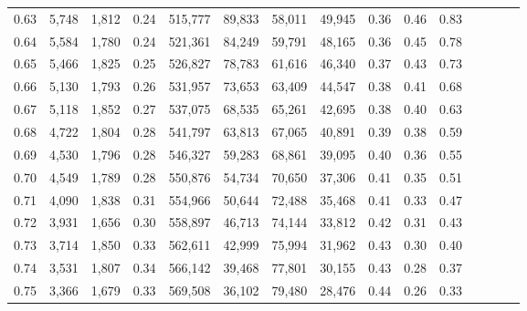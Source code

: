 \begin{tabular}{rrrcrrrrrrrrrrr}
0.63 &   5,748 &  1,812 &                                       0.24 &  515,777 &   89,833 &   58,011 &   49,945 &  0.36 &  0.46 &                         0.83 \\
0.64 &   5,584 &  1,780 &                                       0.24 &  521,361 &   84,249 &   59,791 &   48,165 &  0.36 &  0.45 &                         0.78 \\
0.65 &   5,466 &  1,825 &                                       0.25 &  526,827 &   78,783 &   61,616 &   46,340 &  0.37 &  0.43 &                         0.73 \\
0.66 &   5,130 &  1,793 &                                       0.26 &  531,957 &   73,653 &   63,409 &   44,547 &  0.38 &  0.41 &                         0.68 \\
0.67 &   5,118 &  1,852 &                                       0.27 &  537,075 &   68,535 &   65,261 &   42,695 &  0.38 &  0.40 &                         0.63 \\
0.68 &   4,722 &  1,804 &                                       0.28 &  541,797 &   63,813 &   67,065 &   40,891 &  0.39 &  0.38 &                         0.59 \\
0.69 &   4,530 &  1,796 &                                       0.28 &  546,327 &   59,283 &   68,861 &   39,095 &  0.40 &  0.36 &                         0.55 \\
0.70 &   4,549 &  1,789 &                                       0.28 &  550,876 &   54,734 &   70,650 &   37,306 &  0.41 &  0.35 &                         0.51 \\
0.71 &   4,090 &  1,838 &                                       0.31 &  554,966 &   50,644 &   72,488 &   35,468 &  0.41 &  0.33 &                         0.47 \\
0.72 &   3,931 &  1,656 &                                       0.30 &  558,897 &   46,713 &   74,144 &   33,812 &  0.42 &  0.31 &                         0.43 \\
0.73 &   3,714 &  1,850 &                                       0.33 &  562,611 &   42,999 &   75,994 &   31,962 &  0.43 &  0.30 &                         0.40 \\
0.74 &   3,531 &  1,807 &                                       0.34 &  566,142 &   39,468 &   77,801 &   30,155 &  0.43 &  0.28 &                         0.37 \\
0.75 &   3,366 &  1,679 &                                       0.33 &  569,508 &   36,102 &   79,480 &   28,476 &  0.44 &  0.26 &                         0.33 \\

\end{tabular}
